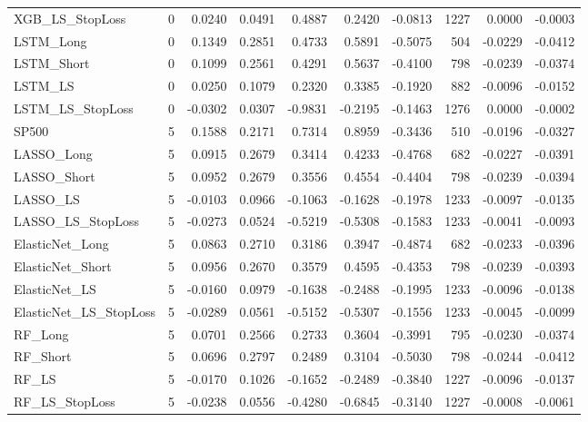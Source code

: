 \begin{tabular}{llrrrrrrrr}
\cline{1-10}
XGB\_LS\_StopLoss & 0 & 0.0240 & 0.0491 & 0.4887 & 0.2420 & -0.0813 & 1227 & 0.0000 & -0.0003 \\
\cline{1-10}
LSTM\_Long & 0 & 0.1349 & 0.2851 & 0.4733 & 0.5891 & -0.5075 & 504 & -0.0229 & -0.0412 \\
\cline{1-10}
LSTM\_Short & 0 & 0.1099 & 0.2561 & 0.4291 & 0.5637 & -0.4100 & 798 & -0.0239 & -0.0374 \\
\cline{1-10}
LSTM\_LS & 0 & 0.0250 & 0.1079 & 0.2320 & 0.3385 & -0.1920 & 882 & -0.0096 & -0.0152 \\
\cline{1-10}
LSTM\_LS\_StopLoss & 0 & -0.0302 & 0.0307 & -0.9831 & -0.2195 & -0.1463 & 1276 & 0.0000 & -0.0002 \\
\cline{1-10}
SP500 & 5 & 0.1588 & 0.2171 & 0.7314 & 0.8959 & -0.3436 & 510 & -0.0196 & -0.0327 \\
\cline{1-10}
LASSO\_Long & 5 & 0.0915 & 0.2679 & 0.3414 & 0.4233 & -0.4768 & 682 & -0.0227 & -0.0391 \\
\cline{1-10}
LASSO\_Short & 5 & 0.0952 & 0.2679 & 0.3556 & 0.4554 & -0.4404 & 798 & -0.0239 & -0.0394 \\
\cline{1-10}
LASSO\_LS & 5 & -0.0103 & 0.0966 & -0.1063 & -0.1628 & -0.1978 & 1233 & -0.0097 & -0.0135 \\
\cline{1-10}
LASSO\_LS\_StopLoss & 5 & -0.0273 & 0.0524 & -0.5219 & -0.5308 & -0.1583 & 1233 & -0.0041 & -0.0093 \\
\cline{1-10}
ElasticNet\_Long & 5 & 0.0863 & 0.2710 & 0.3186 & 0.3947 & -0.4874 & 682 & -0.0233 & -0.0396 \\
\cline{1-10}
ElasticNet\_Short & 5 & 0.0956 & 0.2670 & 0.3579 & 0.4595 & -0.4353 & 798 & -0.0239 & -0.0393 \\
\cline{1-10}
ElasticNet\_LS & 5 & -0.0160 & 0.0979 & -0.1638 & -0.2488 & -0.1995 & 1233 & -0.0096 & -0.0138 \\
\cline{1-10}
ElasticNet\_LS\_StopLoss & 5 & -0.0289 & 0.0561 & -0.5152 & -0.5307 & -0.1556 & 1233 & -0.0045 & -0.0099 \\
\cline{1-10}
RF\_Long & 5 & 0.0701 & 0.2566 & 0.2733 & 0.3604 & -0.3991 & 795 & -0.0230 & -0.0374 \\
\cline{1-10}
RF\_Short & 5 & 0.0696 & 0.2797 & 0.2489 & 0.3104 & -0.5030 & 798 & -0.0244 & -0.0412 \\
\cline{1-10}
RF\_LS & 5 & -0.0170 & 0.1026 & -0.1652 & -0.2489 & -0.3840 & 1227 & -0.0096 & -0.0137 \\
\cline{1-10}
RF\_LS\_StopLoss & 5 & -0.0238 & 0.0556 & -0.4280 & -0.6845 & -0.3140 & 1227 & -0.0008 & -0.0061 \\

\end{tabular}
